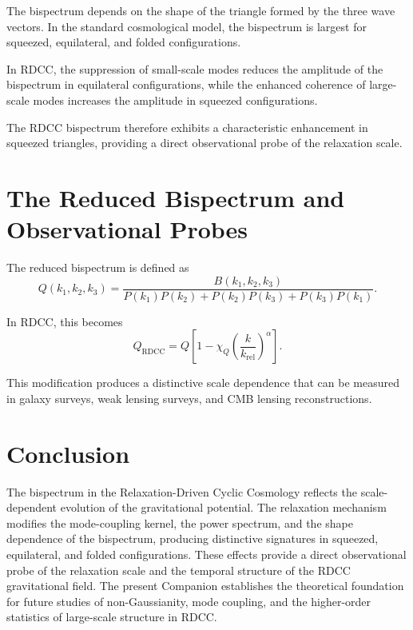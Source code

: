 \documentclass[11pt,a4paper]{article}
\begin{document}
The bispectrum depends on the shape of the triangle formed by the three wave 
vectors. In the standard cosmological model, the bispectrum is largest for 
squeezed, equilateral, and folded configurations.

In RDCC, the suppression of small-scale modes reduces the amplitude of the 
bispectrum in equilateral configurations, while the enhanced coherence of 
large-scale modes increases the amplitude in squeezed configurations.

The RDCC bispectrum therefore exhibits a characteristic enhancement in squeezed 
triangles, providing a direct observational probe of the relaxation scale.
\section{The Reduced Bispectrum and Observational Probes}

The reduced bispectrum is defined as
\begin{equation}
    Q(k_{1},k_{2},k_{3})
    = \frac{
        B(k_{1},k_{2},k_{3})
      }{
        P(k_{1})P(k_{2})
        + P(k_{2})P(k_{3})
        + P(k_{3})P(k_{1})
      }.
\end{equation}

In RDCC, this becomes
\begin{equation}
    Q_{\mathrm{RDCC}}
    = Q
      \left[
        1 - \chi_{Q}
        \left(\frac{k}{k_{\mathrm{rel}}}\right)^{\alpha}
      \right].
\end{equation}

This modification produces a distinctive scale dependence that can be measured in 
galaxy surveys, weak lensing surveys, and CMB lensing reconstructions.
\section{Conclusion}

The bispectrum in the Relaxation-Driven Cyclic Cosmology reflects the 
scale-dependent evolution of the gravitational potential. The relaxation mechanism 
modifies the mode-coupling kernel, the power spectrum, and the shape dependence of 
the bispectrum, producing distinctive signatures in squeezed, equilateral, and 
folded configurations. These effects provide a direct observational probe of the 
relaxation scale and the temporal structure of the RDCC gravitational field. The 
present Companion establishes the theoretical foundation for future studies of 
non-Gaussianity, mode coupling, and the higher-order statistics of large-scale 
structure in RDCC.
\end{document}
